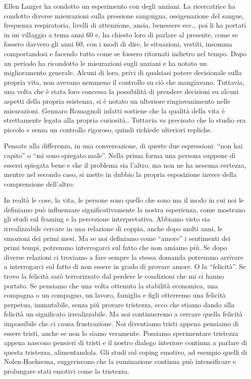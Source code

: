 \documentclass[12pt]{book} %
\begin{document}
Ellen Langer ha condotto un esperimento con degli anziani. La ricercatrice ha condotto diverse misurazioni sulla
pressione sanguigna, ossigenazione del sangue, frequenza respiratoria, livelli di attenzione, ansia, benessere ecc…
poi li ha portati in un villaggio a tema anni 60 e, ha chiesto loro di parlare al presente, come se fossero davvero gli
anni 60, con i modi di dire, le situazioni, vestiti, insomma comportandosi e facendo tutto come se fossero ritornati
indietro nel tempo. Dopo un periodo ha ricondotto le misurazioni sugli anziani e ha notato un miglioramento generale.
Alcuni di loro, privi di qualsiasi potere decisionale sulla propria vita, non avevano nemmeno il controllo su ciò che
mangiavano. Tuttavia, una volta che è stata loro concessa la possibilità di prendere decisioni su alcuni aspetti della
propria esistenza, si è notato un ulteriore ringiovanimento nelle misurazioni. Gennaro Romagnoli infatti sostiene che
la qualità della vita è strettamente legata alla propria
curiosità.. Tuttavia va precisato che lo studio era piccolo e senza un controllo rigoroso, quindi richiede ulteriori repliche.

Pensate alla differenza, in una conversazione, di queste due espressioni: “non hai capito” o “mi sono spiegato male”.
Nella prima forma una persona suppone di essersi spiegata bene e che il problema sia l'altro, ma non ne ha nessuna
certezza, mentre nel secondo caso, si mette in dubbio la propria esposizione invece della comprensione dell'altro.

In realtà le cose, la vita, le persone sono quello che sono ma il modo in cui noi le definiamo può influenzare significativamente la nostra esperienza, come mostrano gli studi sul framing e la percezione interpretativa. Abbiamo visto sia irrealizzabile cercare in una relazione di coppia, anche dopo molti anni, le
emozioni dei primi mesi. Ma se noi definiamo come “amore” i sentimenti dei primi tempi, potremmo interrogarci sul fatto
che non amiamo più. Se dopo diverse relazioni ci troviamo a fare sempre la stessa domanda potremmo arrivare a
interrogarci sul fatto di non essere in grado di provare amore. O la “felicità”. Se trovo la felicità sarò terrorizzato
dal perdere le condizioni che mi ci hanno portato. Se pensiamo che una volta ottenuta la stabilità economica, una
compagna o un compagno, un lavoro, famiglia e figli otterremo una felicità perpetua, immutabile, senza più provare
tristezza, ecco che stiamo dando alla felicità un significato irrealizzabile. Ma noi continueremo a cercare quella
felicità impossibile che ci causa frustrazione. Noi diventiamo tristi appena pensiamo di essere tristi, anche se non lo
siamo veramente. Possiamo sperimentare tristezza appena nascono pensieri di tristi e il nostro dialogo interiore continua a parlare di
questa tristezza, alimentandola. Gli studi sul coping emotivo, ad esempio quelli di Nolen‑Hoeksema, suggeriscono che la ruminazione continua può intensificare e prolungare stati emotivi come la tristezza.
\end{document}
